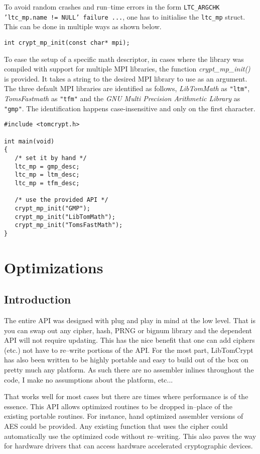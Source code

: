 \documentclass[synpaper]{book}
\newcommand{\mysection}[1]    %
	{                   %
	\section{#1}
   \markboth{\textsf{www.libtom.net}}{\thesection ~ {#1}}
	}
\begin{document}
To avoid random crashes and run--time errors in the form \texttt{LTC\_ARGCHK 'ltc\_mp.name != NULL' failure ...}, one has to
initialise the \texttt{ltc\_mp} struct. This can be done in multiple ways as shown below.

\begin{verbatim}
int crypt_mp_init(const char* mpi);
\end{verbatim}

To ease the setup of a specific math descriptor, in cases where the library was compiled with support for multiple MPI libraries,
the function \textit{crypt\_mp\_init()} is provided.
It takes a string to the desired MPI library to use as an argument.
The three default MPI libraries are identified as follows, \textit{LibTomMath} as \texttt{"ltm"}, \textit{TomsFastmath} as \texttt{"tfm"}
and the \textit{GNU Multi Precision Arithmetic Library} as \texttt{"gmp"}.
The identification happens case-insensitive and only on the first character.


\begin{verbatim}
#include <tomcrypt.h>

int main(void)
{
   /* set it by hand */
   ltc_mp = gmp_desc;
   ltc_mp = ltm_desc;
   ltc_mp = tfm_desc;

   /* use the provided API */
   crypt_mp_init("GMP");
   crypt_mp_init("LibTomMath");
   crypt_mp_init("TomsFastMath");
}
\end{verbatim}


\chapter{Optimizations}
\mysection{Introduction}
The entire API was designed with plug and play in mind at the low level.  That is you can swap out any cipher, hash, PRNG or bignum library and the dependent API will not
require updating.  This has the nice benefit that one can add ciphers (etc.) not have to re--write portions of the API.  For the most part, LibTomCrypt has also been written
to be highly portable and easy to build out of the box on pretty much any platform.  As such there are no assembler inlines throughout the code, I make no assumptions
about the platform, etc...

That works well for most cases but there are times where performance is of the essence.  This API allows optimized routines to be dropped in--place of the existing
portable routines.  For instance, hand optimized assembler versions of AES could be provided.  Any existing function that uses the cipher could automatically use
the optimized code without re--writing.  This also paves the way for hardware drivers that can access hardware accelerated cryptographic devices.
\end{document}
